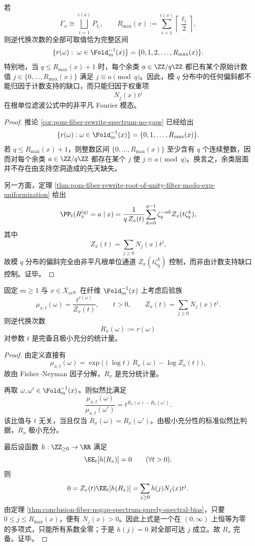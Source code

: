 \begin{theorem}[逆代换计数谱的无缺口性与模偏斜的纯谱来源]\label{thm:conclusion-fiber-nogap-spectrum-purely-spectral-bias}
若
\[
\Gamma_x\cong \bigsqcup_{i=1}^{c(x)} P_{\ell_i},
\qquad
R_{\max}(x):=\sum_{i=1}^{c(x)}\left\lceil \frac{\ell_i}{2}\right\rceil,
\]
则逆代换次数的全部可取值恰为完整区间
\[
\{r(\omega):\ \omega\in \Fold_m^{-1}(x)\}
=
\{0,1,2,\dots,R_{\max}(x)\}.
\]
特别地，当 \(q\le R_{\max}(x)+1\) 时，每个余类 \(a\in \ZZ/q\ZZ\) 都已有某个原始计数值 \(j\in\{0,\dots,R_{\max}(x)\}\) 满足 \(j\equiv a\pmod q\)。因此，模 \(q\) 分布中的任何偏斜都不能归因于计数支持的缺口，而只能归因于权重项
\[
N_j(x)t^j
\]
在根单位滤波公式中的非平凡 Fourier 模态。
\end{theorem}
\begin{proof}
推论 \ref{cor:pom-fiber-rewrite-spectrum-no-gaps} 已经给出
\[
\{r(\omega):\omega\in\Fold_m^{-1}(x)\}
=
\{0,1,\dots,R_{\max}(x)\}.
\]
若 \(q\le R_{\max}(x)+1\)，则整数区间 \(\{0,\dots,R_{\max}(x)\}\) 至少含有 \(q\) 个连续整数，因而对每个余类 \(a\in\ZZ/q\ZZ\) 都存在某个 \(j\) 使 \(j\equiv a\pmod q\)。换言之，余类层面并不存在由支持空洞造成的先天缺失。

另一方面，定理 \ref{thm:pom-fiber-rewrite-root-of-unity-filter-modq-exp-uniformization} 给出
\[
\PP_t(R_x^{(q)}=a\mid x)
=
\frac{1}{q\,Z_x(t)}\sum_{k=0}^{q-1}\zeta_q^{-ak}Z_x(t\zeta_q^k),
\]
其中
\[
Z_x(t)=\sum_{j\ge 0}N_j(x)t^j.
\]
故模 \(q\) 分布的偏斜完全由非平凡根单位通道 \(Z_x(t\zeta_q^k)\) 控制，而非由计数支持缺口控制。证毕。
\end{proof}

\begin{theorem}[纤维后验族的一维完备极小充分统计量]\label{thm:conclusion-fiber-posterior-rewritecount-complete-minimal-sufficient}
固定 \(m\ge 1\) 与 \(x\in X_m\)。在纤维 \(\Fold_m^{-1}(x)\) 上考虑后验族
\[
\mu_{x,t}(\omega)=\frac{t^{r(\omega)}}{Z_x(t)},
\qquad
t>0,
\qquad
Z_x(t)=\sum_{j\ge 0}N_j(x)t^j.
\]
则逆代换次数
\[
R_x(\omega):=r(\omega)
\]
对参数 \(t\) 是完备且极小充分的统计量。
\end{theorem}
\begin{proof}
由定义直接有
\[
\mu_{x,t}(\omega)=\exp\!\bigl((\log t)\,R_x(\omega)-\log Z_x(t)\bigr),
\]
故由 Fisher--Neyman 因子分解，\(R_x\) 是充分统计量。

再取 \(\omega,\omega'\in \Fold_m^{-1}(x)\)。则似然比满足
\[
\frac{\mu_{x,t}(\omega)}{\mu_{x,t}(\omega')}
=
t^{R_x(\omega)-R_x(\omega')}.
\]
该比值与 \(t\) 无关，当且仅当 \(R_x(\omega)=R_x(\omega')\)。由极小充分性的标准似然比判据，\(R_x\) 极小充分。

最后设函数 \(h:\ZZ_{\ge 0}\to\RR\) 满足
\[
\EE_t[h(R_x)]=0
\qquad(\forall t>0).
\]
则
\[
0=Z_x(t)\EE_t[h(R_x)]
=
\sum_{j\ge 0}h(j)N_j(x)t^j.
\]
由定理 \ref{thm:conclusion-fiber-nogap-spectrum-purely-spectral-bias}，只要 \(0\le j\le R_{\max}(x)\)，便有 \(N_j(x)>0\)。因此上式是一个在 \((0,\infty)\) 上恒等为零的多项式，只能所有系数全零；于是 \(h(j)=0\) 对全部可达 \(j\) 成立。故 \(R_x\) 完备。证毕。
\end{proof}

